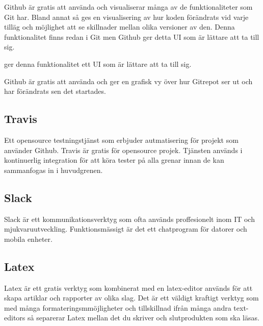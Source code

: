 Github är gratis att använda och visualiserar många av de funktionaliteter som Git har. Bland annat så ges en visualisering av hur koden förändrats vid varje tilläg och möjlighet att se skillnader mellan olika versioner av den. Denna funktionalitet finns redan i Git men Github ger detta UI som är lättare att ta till sig. 

ger denna funktionalitet ett UI som är lättare att ta till sig. 

Github är gratis att använda och ger en grafisk vy över hur Gitrepot ser ut och har förändrats sen det startades. 

\subsection*{Travis}
Ett opensource testningstjänst som erbjuder autmatisering för projekt som använder Github. Travis är gratis för opensource projek. Tjänsten används i kontinuerlig integration för att köra tester på alla grenar innan de kan sammanfogas in i huvudgrenen\cite{Travis:online}.

\subsection*{Slack}
Slack är ett kommunikationsverktyg som ofta används proffesionelt inom IT och mjukvaruutveckling. Funktionsmässigt är det ett chatprogram för datorer och mobila enheter.

\subsection*{Latex}
Latex är ett gratis verktyg som kombinerat med en latex-editor används för att skapa artiklar och rapporter av olika slag. Det är ett väldigt kraftigt verktyg som med många formateringsmmöjligheter och tillskillnad ifrån många andra text-editors så separerar Latex mellan det du skriver och slutprodukten som ska läsas.
